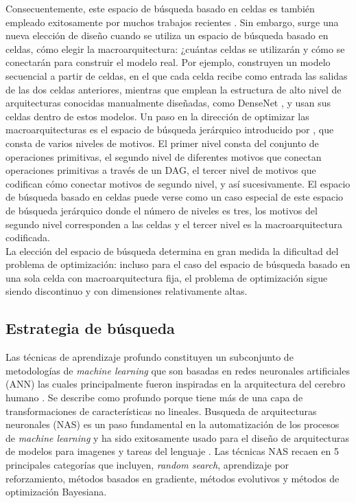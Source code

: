 Consecuentemente, este espacio de búsqueda basado en celdas es también empleado exitosamente por muchos trabajos recientes \parencite{68} \parencite{37} \parencite{62} \parencite{67} \parencite{69}. Sin embargo, surge una nueva elección de diseño cuando se utiliza un espacio de búsqueda basado en celdas, cómo elegir la macroarquitectura: ¿cuántas celdas se utilizarán y cómo se conectarán para construir el modelo real. Por ejemplo, \parencite{56} construyen un modelo secuencial a partir de celdas, en el que cada celda recibe como entrada las salidas de las dos celdas anteriores, mientras que \parencite{69} emplean la estructura de alto nivel de arquitecturas conocidas manualmente diseñadas, como DenseNet \parencite{70}, y usan sus celdas dentro de estos modelos. Un paso en la dirección de optimizar las macroarquitecturas es el espacio de búsqueda jerárquico introducido por \parencite{38}, que consta de varios niveles de motivos. El primer nivel consta del conjunto de operaciones primitivas, el segundo nivel de diferentes motivos que conectan operaciones primitivas a través de un DAG, el tercer nivel de motivos que codifican cómo conectar motivos de segundo nivel, y así sucesivamente. El espacio de búsqueda basado en celdas puede verse como un caso especial de este espacio de búsqueda jerárquico donde el número de niveles es tres, los motivos del segundo nivel corresponden a las celdas y el tercer nivel es la macroarquitectura codificada. \\
La elección del espacio de búsqueda determina en gran medida la dificultad del problema de optimización: incluso para el caso del espacio de búsqueda basado en una sola celda con macroarquitectura fija, el problema de optimización sigue siendo discontinuo y con dimensiones relativamente altas.


\subsection{Estrategia de búsqueda}

Las técnicas de aprendizaje profundo constituyen un subconjunto de metodologías de \textit{machine learning} que son basadas en redes neuronales artificiales (ANN) las cuales principalmente fueron inspiradas en la arquitectura del cerebro humano \parencite{34}. Se describe como profundo porque tiene más de una capa de transformaciones de características no lineales. Busqueda de arquitecturas neuronales (NAS) es un paso fundamental en la automatización de los procesos de \textit{machine learning} y ha sido exitosamente usado para el diseño de arquitecturas de modelos para imagenes y tareas del lenguaje \parencite{35} \parencite{36} \parencite{37} \parencite{38} \parencite{39}. Las técnicas NAS recaen en 5 principales categorías que incluyen, \textit{random search}, aprendizaje por reforzamiento, métodos basados en gradiente, métodos evolutivos y métodos de optimización Bayesiana.

